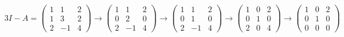 \documentclass{article}
\begin{document}
\begin{align*}
    3I-A=\begin{pmatrix}
             1 & 1  & 2 \\
             1 & 3  & 2 \\
             2 & -1 & 4
         \end{pmatrix} \rightarrow \begin{pmatrix}
                                       1 & 1  & 2 \\
                                       0 & 2  & 0 \\
                                       2 & -1 & 4
                                   \end{pmatrix} \rightarrow \begin{pmatrix}
                                                                 1 & 1  & 2 \\
                                                                 0 & 1  & 0 \\
                                                                 2 & -1 & 4
                                                             \end{pmatrix} \rightarrow \begin{pmatrix}
                                                                                           1 & 0 & 2 \\
                                                                                           0 & 1 & 0 \\
                                                                                           2 & 0 & 4
                                                                                       \end{pmatrix} \rightarrow \begin{pmatrix}
                                                                                                                     1 & 0 & 2 \\
                                                                                                                     0 & 1 & 0 \\
                                                                                                                     0 & 0 & 0
                                                                                                                 \end{pmatrix}
\end{align*}
\end{document}
